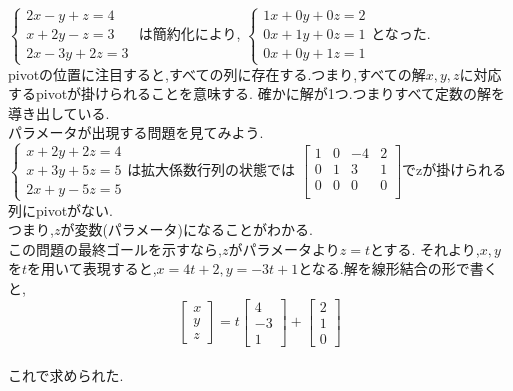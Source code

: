 $\begin{cases}
    2x-y+z=4 \\
    x+2y-z=3 \\
    2x-3y+2z=3
\end{cases}$
は簡約化により,
$\begin{cases}
    1x+0y+0z=2 \\
    0x+1y+0z=1 \\
    0x+0y+1z=1
\end{cases}$となった.\\
pivotの位置に注目すると,すべての列に存在する.つまり,すべての解$x,y,z$に対応するpivotが掛けられることを意味する.
確かに解が1つ.つまりすべて定数の解を導き出している.\\

パラメータが出現する問題を見てみよう.\\
$\begin{cases}
    x+2y+2z=4 \\
    x+3y+5z=5 \\
    2x+y-5z=5
\end{cases}$は拡大係数行列の状態では
$
\begin{bmatrix}
    1 & 0 & -4 & 2 \\
    0 & 1 & 3 & 1 \\
    0 & 0 & 0 & 0 \\
\end{bmatrix}$でzが掛けられる列にpivotがない.\\
つまり,$z$が変数(パラメータ)になることがわかる.\\
この問題の最終ゴールを示すなら,$z$がパラメータより$z=t$とする.
それより,$x,y$を$t$を用いて表現すると,$x=4t+2,y=-3t+1$となる.解を線形結合の形で書くと,\\
\[
\begin{bmatrix}
    x \\ y \\ z
\end{bmatrix}=t
\begin{bmatrix}
    4 \\ -3 \\ 1
\end{bmatrix}+
\begin{bmatrix}
    2 \\ 1 \\ 0
\end{bmatrix}
\]\\
これで求められた.\\

